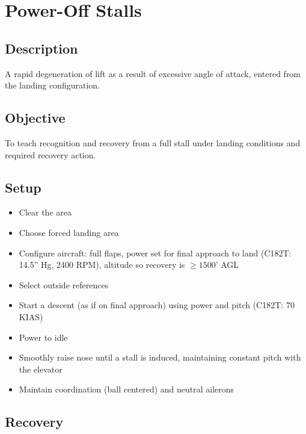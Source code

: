 \section{Power-Off Stalls}

\subsection{Description}

A rapid degeneration of lift as a result of excessive angle of attack, entered
from the landing configuration.

\subsection{Objective}

To teach recognition and recovery from a full stall under landing conditions
and required recovery action.

\subsection{Setup}

\begin{itemize}
  \item Clear the area
  \item Choose forced landing area
  \item Configure aircraft: full flaps, power set for final approach to land
    (C182T: 14.5'' Hg, 2400 RPM), altitude so recovery is $\geq 1500$' AGL
  \item Select outside references
  \item Start a descent (as if on final approach) using power and pitch
    (C182T: 70 KIAS) 
  \item Power to idle
  \item Smoothly raise nose until a stall is induced, maintaining constant
    pitch with the elevator
  \item Maintain coordination (ball centered) and neutral ailerons
\end{itemize}

\subsection{Recovery}

